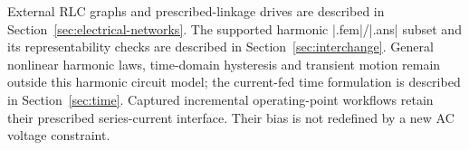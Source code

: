 External RLC graphs and prescribed-linkage drives are described in
Section~\ref{sec:electrical-networks}. The supported harmonic |.fem|/|.ans|
subset and its representability checks are described in Section~\ref{sec:interchange}.
General nonlinear harmonic laws, time-domain hysteresis and transient motion
remain outside this harmonic circuit model; the current-fed time formulation
is described in Section~\ref{sec:time}. Captured incremental operating-point workflows retain
their prescribed series-current interface. Their bias is not redefined by a
new AC voltage constraint.
